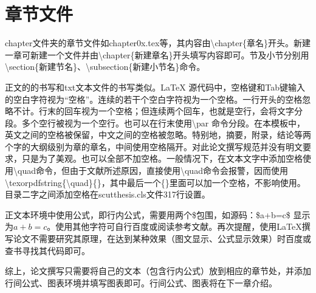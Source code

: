 \section{章节文件}
chapter文件夹的章节文件如chapter0x.tex等，其内容由\textbackslash{}chapter\{章名\}开头。新建一章可新建一个文件并由\textbackslash{}chapter\{新建章名\}开头填写内容即可。节及小节分别用\textbackslash{}section\{新建节名\}、\textbackslash{}subsection\{新建小节名\}命令。

正文的的书写和txt文本文件的书写类似。\LaTeX{} 源代码中，空格键和Tab键输入的空白字符视为“空格”。连续的若干个空白字符视为一个空格。一行开头的空格忽略不计。行末的回车视为一个空格；但连续两个回车，也就是空行，会将文字分段。多个空行被视为一个空行。也可以在行末使用\textbackslash{}par 命令分段。在本模板中，英文之间的空格被保留，中文之间的空格被忽略。特别地，摘要，附录，结论等两个字的大纲级别为章的章名，中间使用空格隔开。对此论文撰写规范并没有明文要求，只是为了美观。也可以全部不加空格。一般情况下，在文本文字中添加空格使用\textbackslash{}quad命令，但由于文献\parencite{_d}所述原因，直接使用\textbackslash{}quad命令会报警，因而使用\textbackslash{}texorpdfstring\{\textbackslash{}quad\}\{\}，其中最后一个\{\}里面可以加一个空格，不影响使用。目录二字之间添加空格在scutthesis.cls文件317行设置。

正文本环境中使用公式，即行内公式，需要用两个\$包围，如源码：\$a+b=c\$ 显示为$a+b=c$。使用其他字符可自行百度或阅读参考文献。再次提醒，使用\LaTeX{}撰写论文不需要研究其原理，在达到某种效果（图文显示、公式显示效果）时百度或查书寻找其代码即可。

综上，论文撰写只需要将自己的文本（包含行内公式）放到相应的章节处，并添加行间公式、图表环境并填写图表即可。行间公式、图表将在下一章介绍。

